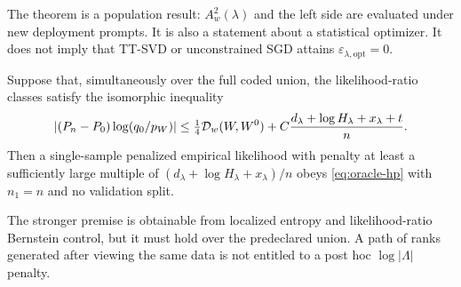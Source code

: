 The theorem is a population result: \(A_w^2(\lambda)\) and the left side are evaluated under new deployment prompts. It is also a statement about a statistical optimizer. It does not imply that TT-SVD or unconstrained SGD attains \(\varepsilon_{\lambda,\mathrm{opt}}=0\).

\begin{corollary}
\label{cor:same-sample-oracle}
Suppose that, simultaneously over the full coded union, the likelihood-ratio classes satisfy the isomorphic inequality
\[
 |(P_n-P_0)\log(q_0/p_W)|
 \le \tfrac14\mathcal D_w(W,W^0)
 +C\frac{d_\lambda+\log H_\lambda+x_\lambda+t}{n}.
\]
Then a single-sample penalized empirical likelihood with penalty at least a sufficiently large multiple of \((d_\lambda+\log H_\lambda+x_\lambda)/n\) obeys \cref{eq:oracle-hp} with \(n_1=n\) and no validation split.
\end{corollary}

The stronger premise is obtainable from localized entropy and likelihood-ratio Bernstein control, but it must hold over the predeclared union. A path of ranks generated after viewing the same data is not entitled to a post hoc \(\log|\Lambda|\) penalty.
